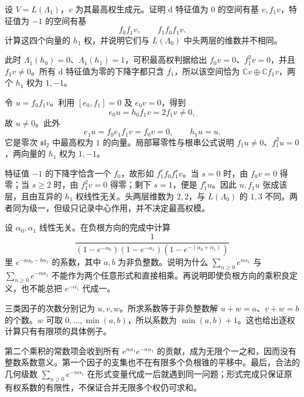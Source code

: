 \begin{exercise}\label{b5:ex:G-level-one-second-module}
	设 \(V=L(\Lambda_1)\)，\(v\) 为其最高权生成元。证明 \(\mathrm d\) 特征值为 \(0\) 的空间有基 \(v,f_1v\)，特征值为 \(-1\) 的空间有基
	\[
		f_0f_1v,\qquad f_1f_0f_1v.
	\]
	计算这四个向量的 \(h_1\) 权，并说明它们与 \(L(\Lambda_0)\) 中头两层的维数并不相同。
\end{exercise}
\begin{solution}
	此时 \(\Lambda_1(h_0)=0\)、\(\Lambda_1(h_1)=1\)，可积最高权判据给出 \(f_0v=0\)、\(f_1^2v=0\)，并且 \(f_1v\ne0\)。所有 \(\mathrm d\) 特征值为零的下降字都只含 \(f_1\)，所以该空间恰为 \(\mathbb Cv\oplus\mathbb Cf_1v\)，两个 \(h_1\) 权为 \(1,-1\)。

	令 \(u=f_0f_1v\)。利用 \([e_0,f_1]=0\) 及 \(e_0v=0\)，得到
	\[
		e_0u=h_0f_1v=2f_1v\ne0,
	\]
	故 \(u\ne0\)。此外
	\[
		e_1u=f_0e_1f_1v=f_0v=0,
		\qquad h_1u=u.
	\]
	它是零次 \(\mathfrak{sl}_2\) 中最高权为 \(1\) 的向量。局部幂零性与根串公式说明 \(f_1u\ne0\)、\(f_1^2u=0\)，两向量的 \(h_1\) 权为 \(1,-1\)。

	特征值 \(-1\) 的下降字恰含一个 \(f_0\)，故形如 \(f_1^rf_0f_1^sv\)。当 \(s=0\) 时，由 \(f_0v=0\) 得零；当 \(s\ge2\) 时，由 \(f_1^2v=0\) 得零；剩下 \(s=1\)，便是 \(f_1^ru\)。因此 \(u,f_1u\) 张成该层，且由互异的 \(h_1\) 权线性无关。头两层维数为 \(2,2\)，与 \(L(\Lambda_0)\) 的 \(1,3\) 不同。两者同为级一，但级只记录中心作用，并不决定最高权模。
\end{solution}



\begin{exercise}\label{b5:ex:G-completion-boundary}
	设 \(\alpha_0,\alpha_1\) 线性无关。在负根方向的完成中计算
	\[
		\frac1{(1-e^{-\alpha_0})(1-e^{-\alpha_1})(1-e^{-(\alpha_0+\alpha_1)})}
	\]
	里 \(e^{-a\alpha_0-b\alpha_1}\) 的系数，其中 \(a,b\) 为非负整数。说明为什么 \(\sum_{n\ge0}e^{n\alpha_1}\) 与 \(\sum_{n\ge0}e^{-n\alpha_1}\) 不能作为两个任意形式和直接相乘。再说明即使负根方向的乘积良定义，也不能总把 \(e^{-\alpha_1}\) 代成一。
\end{exercise}
\begin{solution}
	三类因子的次数分别记为 \(u,v,w\)。所求系数等于非负整数解 \(u+w=a\)、\(v+w=b\) 的个数。\(w\) 可取 \(0,\ldots,\min(a,b)\)，所以系数为 \(\min(a,b)+1\)。这也给出逐权计算只有有限项的具体例子。

	第二个乘积的常数项会收到所有 \(e^{n\alpha_1}e^{-n\alpha_1}\) 的贡献，成为无限个一之和，因而没有整数系数意义。第一个因子的支集也不在有限多个负根锥的平移中。最后，合法的几何级数 \(\sum_{n\ge0}e^{-n\alpha_1}\) 在形式变量代成一后就遇到同一问题；形式完成只保证原有权系数的有限性，不保证合并无限多个权仍可求和。
\end{solution}

